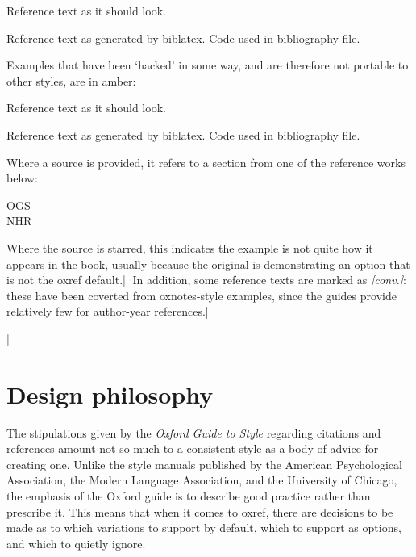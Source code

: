 \documentclass[extrafontsizes,11pt,a4paper,oneside]{memoir}
\newcommand{\booksym}{\makebox[1em][c]{\faicon{book}}}
\newcommand{\cogsym}{\makebox[1em][c]{\faicon{cog}}}
\begin{document}
\begin{tcolorbox}%
  [bicolor
  ,colframe = ok
  ,colback = ok!5!white
  ,colbacklower = white
  ,fontlower = \footnotesize\ttfamily
  ,overlay = {\node[anchor=south east,text=teal] at (frame.south east) {Source};}
  ]
  \hangfrom{\booksym\space} Reference text as it should look.\par
  \hangfrom{\cogsym\space} Reference text as generated by \textsf{biblatex}.
  \tcblower
  Code used in bibliography file.
\end{tcolorbox}

Examples that have been ‘hacked’ in some way, and are therefore not portable
to other styles, are in amber:

\begin{tcolorbox}%
  [bicolor
  ,colframe = hacked
  ,colback = hacked!5!white
  ,colbacklower = white
  ,fontlower = \footnotesize\ttfamily
  ,overlay = {\node[anchor=south east,text=teal] at (frame.south east) {Source};}
  ]
  \hangfrom{\booksym\space} Reference text as it should look.\par
  \hangfrom{\cogsym\space} Reference text as generated by \textsf{biblatex}.
  \tcblower
  Code used in bibliography file.
\end{tcolorbox}

Where a source is provided, it refers to a section from one of the reference works below:

\begin{description}
\item[OGS]

\item[NHR]
\end{description}

Where the source is starred, this indicates the example is not quite how it appears in the book,
usually because the original is demonstrating an option that is not the \textsf{oxref} default.|
\todoc[oxyear]|In addition, some reference texts are marked as \emph{[conv.]}:
these have been coverted from \textsf{oxnotes}-style examples,
since the guides provide relatively few for author-year references.|

\todoc|

\section{Design philosophy}

The stipulations given by the \emph{Oxford Guide to Style} regarding citations and references
amount not so much to a consistent style as a body of advice for creating one.
Unlike the style manuals published by the American Psychological Association,
the Modern Language Association, and the University of Chicago,
the emphasis of the Oxford guide is to describe good practice rather than prescribe it.
This means that when it comes to \textsf{oxref}, there are decisions to be made
as to which variations to support by default, which to support as options,
and which to quietly ignore.
\end{document}

